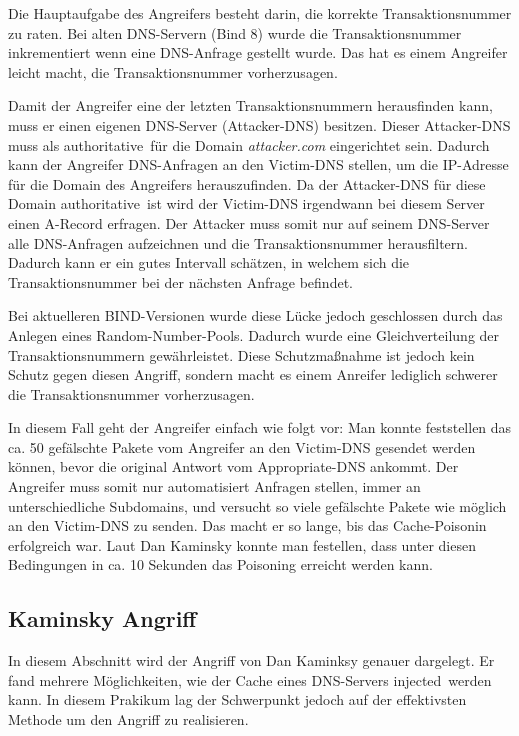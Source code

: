 \documentclass[10pt,a4paper]{article}
\begin{document}
Die Hauptaufgabe des Angreifers besteht darin, die korrekte Transaktionsnummer zu raten. Bei alten DNS-Servern (Bind 8) wurde die Transaktionsnummer inkrementiert wenn eine DNS-Anfrage gestellt wurde. Das hat es einem Angreifer leicht macht, die Transaktionsnummer vorherzusagen.

Damit der Angreifer eine der letzten Transaktionsnummern herausfinden kann, muss er einen eigenen DNS-Server (Attacker-DNS) besitzen. Dieser Attacker-DNS muss als \glqq authoritative\grqq\ für die Domain \emph{attacker.com} eingerichtet sein. Dadurch kann der Angreifer DNS-Anfragen an den Victim-DNS stellen, um die IP-Adresse für die Domain des Angreifers herauszufinden. Da der Attacker-DNS für diese Domain \glqq authoritative\grqq\ ist wird der Victim-DNS irgendwann bei diesem Server einen A-Record erfragen. Der Attacker muss somit nur auf seinem DNS-Server alle DNS-Anfragen aufzeichnen und die Transaktionsnummer herausfiltern. Dadurch kann er ein gutes Intervall schätzen, in welchem sich die Transaktionsnummer bei der nächsten Anfrage befindet.

Bei aktuelleren BIND-Versionen wurde diese Lücke jedoch geschlossen durch das Anlegen eines Random-Number-Pools. Dadurch wurde eine Gleichverteilung der Transaktionsnummern gewährleistet. Diese Schutzmaßnahme ist jedoch kein Schutz gegen diesen Angriff, sondern macht es einem Anreifer lediglich schwerer die Transaktionsnummer vorherzusagen. 

In diesem Fall geht der Angreifer einfach wie folgt vor: Man konnte feststellen das ca. 50 gefälschte Pakete vom Angreifer an den Victim-DNS gesendet werden können, bevor die original Antwort vom Appropriate-DNS ankommt. Der Angreifer muss somit nur automatisiert Anfragen stellen, immer an unterschiedliche Subdomains, und versucht so viele gefälschte Pakete wie möglich an den Victim-DNS zu senden. Das macht er so lange, bis das Cache-Poisonin erfolgreich war. Laut Dan Kaminsky konnte man festellen, dass unter diesen Bedingungen in ca. 10 Sekunden das Poisoning erreicht werden kann.

\subsection{Kaminsky Angriff}
In diesem Abschnitt wird der Angriff von Dan Kaminksy genauer dargelegt. Er fand mehrere Möglichkeiten, wie der Cache eines DNS-Servers \glqq injected\grqq\ werden kann. In diesem Prakikum lag der Schwerpunkt jedoch auf der effektivsten Methode um den Angriff zu realisieren. 
\end{document}
